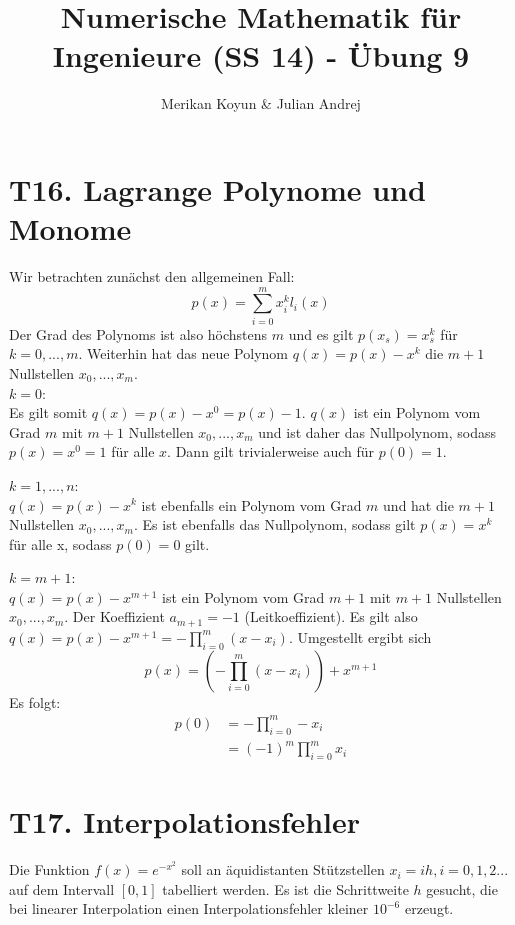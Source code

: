 \documentclass[11pt]{article}
\theoremstyle{plain}
\theoremstyle{definition}
\renewcommand{\a}{\"{a}}
\renewcommand{\o}{\"{o}}
\renewcommand{\u}{\"{u}}
\begin{document}
\title{Numerische Mathematik f\u r Ingenieure (SS 14) - \"{U}bung 9}
\author{Merikan Koyun \& Julian Andrej}
\maketitle

\section*{T16. Lagrange Polynome und Monome}
Wir betrachten zun\a chst den allgemeinen Fall:
\begin{equation}
p(x) = \sum_{i=0}^m x_i^k l_i(x)
\end{equation}
Der Grad des Polynoms ist also h\o chstens $m$ und es gilt $p(x_s)=x_s^k$ f\u r $k=0,...,m$.
Weiterhin hat das neue Polynom $q(x)=p(x)-x^k$ die $m+1$ Nullstellen $x_0, ..., x_m$.\\

$k=0$:\\
Es gilt somit $q(x) = p(x) - x^0 = p(x) - 1$. $q(x)$ ist ein Polynom vom Grad $m$ mit $m+1$ Nullstellen $x_0, ..., x_m$ und ist daher das Nullpolynom, sodass $p(x)=x^0=1$ f\u r alle $x$. Dann gilt trivialerweise auch f\u r $p(0)=1$. \vspace{0.3cm}

$k=1,...,n$:\\
$q(x)=p(x)-x^k$ ist ebenfalls ein Polynom vom Grad $m$ und hat die $m+1$ Nullstellen $x_0, ..., x_m$. Es ist ebenfalls das Nullpolynom, sodass gilt $p(x)=x^k$ f\u r alle x, sodass $p(0)=0$ gilt. \vspace{0.3cm}

$k=m+1$:\\
$q(x)=p(x)-x^{m+1}$ ist ein Polynom vom Grad $m+1$ mit $m+1$ Nullstellen $x_0, ..., x_m$. Der Koeffizient $a_{m+1}=-1$ (Leitkoeffizient).
Es gilt also $q(x) = p(x) - x^{m+1} = - \prod_{i=0}^m (x-x_i)$. Umgestellt ergibt sich
\begin{equation}
p(x)= \left(- \prod_{i=0}^m (x-x_i)\right) + x^{m+1}
\end{equation}
Es folgt:
\begin{align}
p(0) &= -\prod_{i=0}^m -x_i \\
&= (-1)^m\prod_{i=0}^m x_i
\end{align}


\section*{T17. Interpolationsfehler}
Die Funktion $f(x)=e^{-x^2}$ soll an \a quidistanten St\u tzstellen $x_i = ih, i=0,1,2...$ auf dem Intervall $[0,1]$ tabelliert werden. Es ist die Schrittweite $h$ gesucht, die bei linearer Interpolation einen Interpolationsfehler kleiner $10^{-6}$ erzeugt.\vspace{0.3cm}
\end{document}
